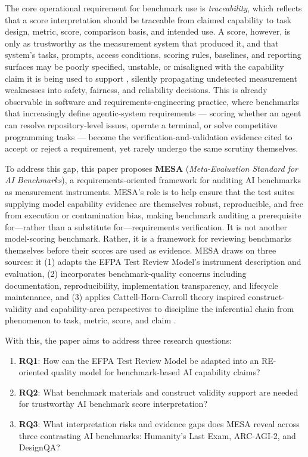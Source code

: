 \documentclass[conference]{IEEEtran}
\begin{document}
    The core operational requirement for benchmark use is \textit{traceability}, which reflects that a score interpretation should be traceable from claimed capability to task design, metric, score, comparison basis, and intended use. A score, however, is only as trustworthy as the measurement system that produced it, and that system's tasks, prompts, access conditions, scoring rules, baselines, and reporting surfaces may be poorly specified, unstable, or misaligned with the capability claim it is being used to support \cite{singh_leaderboard_illusion,line_goes_up}, silently propagating undetected measurement weaknesses into safety, fairness, and reliability decisions. This is already observable in software and requirements-engineering practice, where benchmarks that increasingly define agentic-system requirements --- scoring whether an agent can resolve repository-level issues, operate a terminal, or solve competitive programming tasks --- become the verification-and-validation evidence cited to accept or reject a requirement, yet rarely undergo the same scrutiny themselves.
    
    To address this gap, this paper proposes \textbf{MESA} (\textit{Meta-Evaluation Standard for AI Benchmarks}), a requirements-oriented framework for auditing AI benchmarks as measurement instruments. MESA's role is to help ensure that the test suites supplying model capability evidence are themselves robust, reproducible, and free from execution or contamination bias, making benchmark auditing a prerequisite for---rather than a substitute for---requirements verification. It is not another model-scoring benchmark. Rather, it is a framework for reviewing benchmarks themselves before their scores are used as evidence. MESA draws on three sources: it (1) adapts the EFPA Test Review Model's instrument description and evaluation, (2) incorporates benchmark-quality concerns \cite{reuel_betterbench} including documentation, reproducibility, implementation transparency, and lifecycle maintenance, and (3) applies Cattell-Horn-Carroll theory inspired construct-validity and capability-area perspectives to discipline the inferential chain from phenomenon to task, metric, score, and claim \cite{bean_measuring_what_matters,hendrycks_definition_agi}.
    
    With this, the paper aims to address three research questions:
    \begin{enumerate}[leftmargin=*]
        \item \textbf{RQ1}: How can the EFPA Test Review Model be adapted into an RE-oriented quality model for benchmark-based AI capability claims?
        \item \textbf{RQ2}: What benchmark materials and construct validity support are needed for trustworthy AI benchmark score interpretation?
        \item \textbf{RQ3}: What interpretation risks and evidence gaps does MESA reveal across three contrasting AI benchmarks: Humanity's Last Exam, ARC-AGI-2, and DesignQA?
    \end{enumerate}
    
\end{document}
